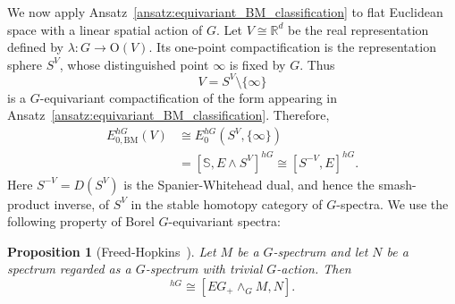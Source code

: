 \documentclass[aps,prx,reprint,superscriptaddress,twocolumn,amsmath,amssymb,amsfonts, nofootinbib]{revtex4-2}
\theoremstyle{apsstyle}
\newtheorem{proposition}[theorem]{Proposition}
\begin{document}
\noindent We now apply Ansatz~\ref{ansatz:equivariant_BM_classification} to flat Euclidean
space with a linear spatial action of $G$. Let
$V\cong\mathbb R^d$ be the real representation defined by $\lambda:G\longrightarrow\mathrm O(V)$.
Its one-point compactification is the representation sphere $S^V$,
whose distinguished point $\infty$ is fixed by $G$. Thus
\begin{equation*}
    V
    =
    S^V\setminus\{\infty\}
\end{equation*}
is a $G$-equivariant compactification of the form appearing in
Ansatz~\ref{ansatz:equivariant_BM_classification}. Therefore,
\begin{equation}
\begin{aligned}
    E_{0,\mathrm{BM}}^{hG}(V)
    &\cong
    E_0^{hG}(S^V,\{\infty\})\\
    &=
    \left[
        \mathbb S,
        E\wedge S^V
    \right]^{hG}\cong
    \left[
        S^{-V},
        E
    \right]^{hG}.
\end{aligned}
\label{eq:equivariant_Euclidean_BM_classification}
\end{equation}
Here $S^{-V}=D(S^V)$ is the Spanier-Whitehead dual, and hence the
smash-product inverse, of $S^V$ in the stable homotopy category of
$G$-spectra. We use the following property of Borel $G$-equivariant spectra:

\bigskip 

\begin{proposition}[Freed-Hopkins~{\cite[Sec.~4.1]{Freed2021}}]
\label{prop:B4}
Let $M$ be a $G$-spectrum and let $N$ be a spectrum regarded as a
$G$-spectrum with trivial $G$-action. Then
\begin{equation}
    [M,N]^{hG}
    \cong
    [EG_+\wedge_GM,N].
    \label{eq:Borel_maps_orbit_spectrum}
\end{equation}
\end{proposition}

\bigskip
\end{document}
